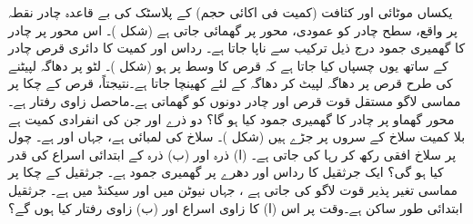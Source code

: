 یکساں موٹائی  اور کثافت (کمیت فی اکائی حجم) کے   پلاسٹک  کی بے قاعدہ  چادر نقطہ  پر واقع، سطح  چادر  کو عمودی،  محور  پر گھمائی جاتی ہے (شکل )۔ اس محور پر چادر کا گھمیری جمود درج ذیل ترکیب سے ناپا جاتا ہے۔ رداس   اور کمیت  کا دائری قرص  چادر کے ساتھ  یوں چسپاں کیا جاتا ہے  کہ قرص کا وسط   پر ہو (شکل )۔ لٹو  پر  دھاگہ لپیٹنے کی طرح  قرص  پر  دھاگہ   لپیٹ کر دھاگہ  کے لئے کھینچا جاتا ہے۔نتیجتاً،  قرص کے چکا پر مماسی لاگو    مستقل قوت  قرص اور چادر دونوں کو گھماتی ہے۔ماحصل زاوی رفتار  ہے۔ محور گھماو پر چادر کا گھمیری جمود کیا ہو گا؟
دو ذرے  اور  جن کی انفرادی کمیت  ہے بلا کمیت سلاخ کے سروں پر جڑے ہیں (شکل )۔ سلاخ کی لمبائی  ہے، جہاں  اور  ہے۔ چول پر سلاخ افقی رکھ کر رہا کی جاتی ہے۔ (ا) ذرہ  اور (ب) ذرہ  کے ابتدائی اسراع کی قدر کیا ہو گی؟
ایک جرثقیل   کا رداس  اور دھرے پر گھمیری جمود  ہے۔ جرثقیل کے چکا پر مماسی تغیر پذیر   قوت  لاگو کی جاتی ہے ، جہاں  نیوٹن میں اور  سیکنڈ میں ہے۔ جرثقیل ابتدائی طور ساکن ہے۔وقت  پر اس (ا) کا زاوی اسراع اور (ب) زاوی رفتار کیا ہوں گے؟


